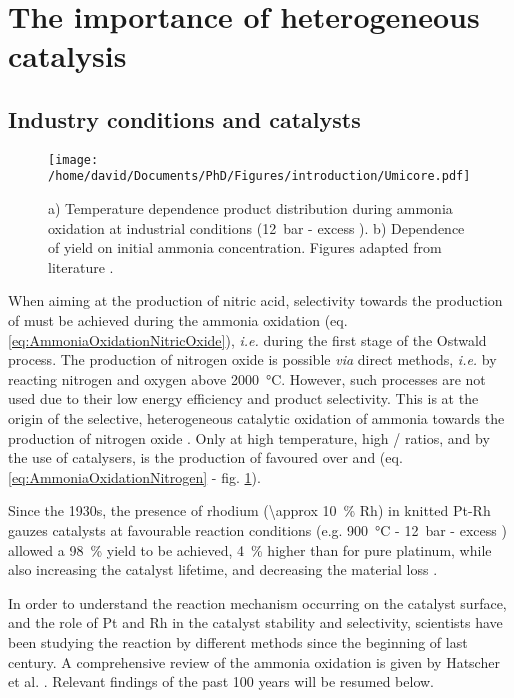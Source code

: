 \section{The importance of heterogeneous catalysis}\label{sec:AmoOxiHC}

\subsection{Industry conditions and catalysts}

\begin{figure}[!htb]
    \centering
    \texttt{[image: /home/david/Documents/PhD/Figures/introduction/Umicore.pdf]}
    \caption{
    a) Temperature dependence product distribution during ammonia oxidation at industrial conditions (\qty{12}{\bar} - excess ).
    b) Dependence of  yield on initial ammonia concentration.
    Figures adapted from literature \parencite{Heck1982, Hatscher2008}.
    }
    \label{fig:Products}
\end{figure}

When aiming at the production of nitric acid, selectivity towards the production of  must be achieved during the ammonia oxidation (eq. \ref{eq:AmmoniaOxidationNitricOxide}), \textit{i.e.} during the first stage of the Ostwald process.
The production of nitrogen oxide is possible \textit{via} direct methods, \textit{i.e.} by reacting nitrogen and oxygen above \qty{2000}{\degreeCelsius}.
However, such processes are not used due to their low energy efficiency and product selectivity.
This is at the origin of the selective, heterogeneous catalytic oxidation of ammonia towards the production of nitrogen oxide \parencite{Hatscher2008}.
Only at high temperature, high / ratios, and by the use of catalysers, is the production of  favoured over  and  (eq. \ref{eq:AmmoniaOxidationNitrogen} - fig. \ref{fig:Products}).

Since the 1930s, the presence of rhodium (\qty{\approx 10}{\percent} Rh) in knitted Pt-Rh gauzes catalysts at favourable reaction conditions (e.g. \qty{900}{\degreeCelsius} - \qty{12}{\bar} - excess ) allowed a \qty{98}{\percent}  yield to be achieved, \qty{4}{\percent} higher than for pure platinum, while also increasing the catalyst lifetime, and decreasing the material loss \parencite{Kaiser1909, Handforth1934, Heck1982, Hatscher2008}.

In order to understand the reaction mechanism occurring on the catalyst surface, and the role of Pt and Rh in the catalyst stability and selectivity, scientists have been studying the reaction by different methods since the beginning of last century.
A comprehensive review of the ammonia oxidation is given by Hatscher et al. \parencite*{Hatscher2008}.
Relevant findings of the past 100 years will be resumed below.

